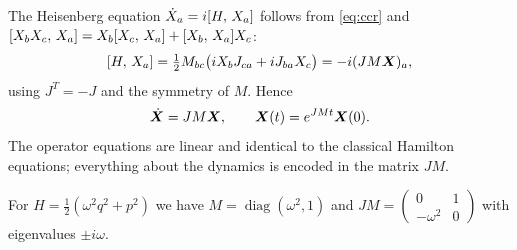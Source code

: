 The Heisenberg equation $\dot X_a = i[H,\,X_a]$ follows from \eqref{eq:ccr} and
$[X_bX_c,\,X_a] = X_b[X_c,\,X_a] + [X_b,\,X_a]X_c$:
\begin{equation}
  [H,\,X_a] = \tfrac12 M_{bc}\bigl(i X_b J_{ca} + i J_{ba} X_c\bigr) = -i (JM\bm{X})_a ,
\end{equation}
using $J^T = -J$ and the symmetry of $M$. Hence
\begin{equation}\label{eq:eom}
  \dot{\bm{X}} = J M \bm{X} , \qquad \bm{X}(t) = e^{JMt}\bm{X}(0).
\end{equation}
The operator equations are linear and identical to the classical Hamilton equations; everything about the
dynamics is encoded in the matrix $JM$.

\begin{example}
For $H = \frac12(\omega^2 q^2 + p^2)$ we have $M = \operatorname{diag}(\omega^2, 1)$ and
$JM = \begin{pmatrix}0&1\\-\omega^2&0\end{pmatrix}$ with eigenvalues $\pm i\omega$.
\end{example}

